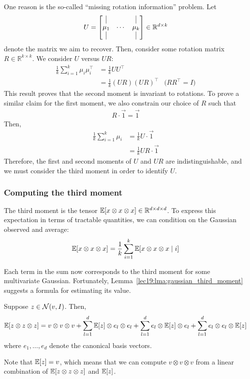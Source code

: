 One reason is the so-called ``missing rotation information'' problem. Let 
\begin{equation}
    U =\begin{bmatrix} \vrule & & \vrule \\ \mu_1 & \cdots & \mu_k \\ \vrule & & \vrule \end{bmatrix} \in\mathbb{R}^{d\times k}
\end{equation}
denote the matrix we aim to recover. Then, consider some rotation matrix $R\in\mathbb{R}^{k\times k}$. We consider $U$ versus $U R$:
\begin{align}
    \frac{1}{k}\sum_{i=1}^k\mu_i\mu_i^\top &= \frac{1}{k}U U^\top \\
    &=\frac{1}{k}(U R)(U R)^\top &\text{($RR^\top=I$)}
\end{align}
This result proves that the second moment is invariant to rotations. To prove a similar claim for the first moment, we also constrain our choice of $R$ such that
\begin{align}
    R\cdot\Vec{1}=\Vec{1}
\end{align}
Then,
\begin{align}
    \frac{1}{k}\sum_{i=1}^k\mu_i&=\frac{1}{k} U \cdot\Vec{1} \\
    &=\frac{1}{k} U R\cdot\Vec{1}
\end{align}
Therefore, the first and second moments of $U$ and $U R$ are indistinguishable, and we must consider the third moment in order to identify $U$.

\subsubsection{Computing the third moment}

The third moment is the tensor $\operatorname*{\mathbb{E}}[x \otimes x \otimes x] \in \mathbb{R}^{d \times d \times d}$. To express this expectation in terms of tractable quantities, we can condition on the Gaussian observed and average:
\begin{align}
	\operatorname*{\mathbb{E}}[x \otimes x \otimes x] = \frac{1}{k} \sum_{i=1}^k \operatorname*{\mathbb{E}}[x \otimes x \otimes x \mid i]
\end{align}

Each term in the sum now corresponds to the third moment for some multivariate Gaussian. Fortunately, Lemma~\ref{lec19:lma:gaussian_third_moment} suggests a formula for estimating its value.
\begin{lemma} \label{lec19:lma:gaussian_third_moment}
Suppose $z \in \mathcal N(v, I)$. Then, 
\begin{align}
	\operatorname*{\mathbb{E}}[z \otimes z \otimes z] = v \otimes v \otimes v +  \sum_{l=1}^d \operatorname*{\mathbb{E}}[z] \otimes e_l \otimes e_l + \sum_{l=1}^d  e_l \otimes \operatorname*{\mathbb{E}}[z] \otimes e_l + \sum_{l=1}^d  e_l \otimes e_l \otimes \operatorname*{\mathbb{E}}[z] 
\end{align}
where $e_1,\dots,e_d$ denote the canonical basis vectors.
\end{lemma}
Note that $\operatorname*{\mathbb{E}}[z] = v$, which means that we can compute $v \otimes v \otimes v$ from a linear combination of $\operatorname*{\mathbb{E}}[z \otimes z \otimes z]$  and $\operatorname*{\mathbb{E}}[z]$.

